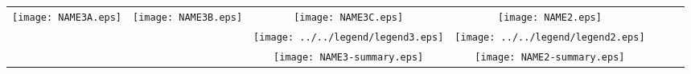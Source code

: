 \documentclass{minimal}
\begin{document}
\begin{tabular}[t]{ccccccc}
	\multirow{3}{*}{ \begin{minipage}[t][][b]{0.250\textwidth} {\centering \texttt{[image: NAME3A.eps]}} \end{minipage} } & 
	\multirow{3}{*}{ \begin{minipage}[t][][b]{0.245\textwidth} {\centering \texttt{[image: NAME3B.eps]}} \end{minipage} } & 
	\begin{minipage}[t][][b]{0.250\textwidth} {\centering \texttt{[image: NAME3C.eps]}} \vfill \end{minipage} & 
	\begin{minipage}[t][][b]{0.250\textwidth} {\centering \texttt{[image: NAME2.eps]}} \vfill \end{minipage} \\

 && \begin{minipage}[t][][t]{0.115\textwidth} {\centering \texttt{[image: ../../legend/legend3.eps]}} \end{minipage} & 
    \begin{minipage}[t][][t]{0.100\textwidth} {\centering \texttt{[image: ../../legend/legend2.eps]}} \end{minipage}\\

 && \begin{minipage}[t][][t]{0.095\textwidth} {\centering \texttt{[image: NAME3-summary.eps]}} \end{minipage} & 
    \begin{minipage}[t][][t]{0.08\textwidth} {\centering \texttt{[image: NAME2-summary.eps]}} \end{minipage}

\end{tabular}
\end{document}
